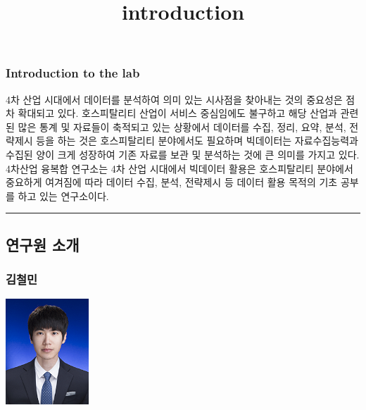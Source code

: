 \documentclass[
]{article}
\title{introduction}
\author{}
\date{\vspace{-2.5em}}
\begin{document}
\maketitle

\hypertarget{introduction-to-the-lab}{%
\subsubsection{Introduction to the lab}\label{introduction-to-the-lab}}

4차 산업 시대에서 데이터를 분석하여 의미 있는 시사점을 찾아내는 것의
중요성은 점차 확대되고 있다. 호스피탈리티 산업이 서비스 중심임에도
불구하고 해당 산업과 관련된 많은 통계 및 자료들이 축적되고 있는 상황에서
데이터를 수집, 정리, 요약, 분석, 전략제시 등을 하는 것은 호스피탈리티
분야에서도 필요하며 빅데이터는 자료수집능력과 수집된 양이 크게 성장하여
기존 자료를 보관 및 분석하는 것에 큰 의미를 가지고 있다. 4차산업 융복합
연구소는 4차 산업 시대에서 빅데이터 활용은 호스피탈리티 분야에서
중요하게 여겨짐에 따라 데이터 수집, 분석, 전략제시 등 데이터 활용 목적의
기초 공부를 하고 있는 연구소이다.

\begin{center}\rule{0.5\linewidth}{0.5pt}\end{center}

\hypertarget{uxc5f0uxad6cuxc6d0-uxc18cuxac1c}{%
\subsection{연구원 소개}\label{uxc5f0uxad6cuxc6d0-uxc18cuxac1c}}

\hypertarget{uxae40uxcca0uxbbfc}{%
\subsubsection{김철민}\label{uxae40uxcca0uxbbfc}}

\includegraphics{images/figure2.png}
\end{document}
